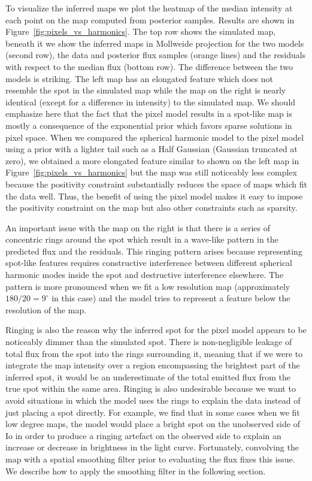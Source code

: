 \documentclass[linenumbers,modern]{aastex62}
\begin{document}
To visualize the inferred maps we plot the heatmap of the median intensity at each point on the map computed from posterior samples.
Results are shown in Figure~\ref{fig:pixels_vs_harmonics}.
The top row shows the simulated map, beneath it we show the inferred maps in Mollweide projection for the two models (second row), the data and posterior flux samples (orange lines) and the residuals with respect to the median flux (bottom row).
The difference between the two models is striking. 
The left map has an elongated feature which does not resemble the spot in the simulated map while the map on the right is nearly identical (except for a difference in intensity) to the simulated map. 
We should emphasize here that the fact that the pixel model results in a spot-like map is mostly a consequence of the exponential prior which favors sparse solutions in pixel space.
When we compared the spherical harmonic model to the pixel model using a prior with a lighter tail such as a Half Gaussian (Gaussian truncated at zero), we obtained a more elongated feature similar to shown on the left map in Figure~\ref{fig:pixels_vs_harmonics} but the map was still noticeably less complex because the positivity constraint substantially reduces the space of maps which fit the data well. 
Thus, the benefit of using the pixel model makes it easy to impose the positivity constraint on the map but also other constraints such as sparsity.

An important issue with the map on the right is that there is a series of concentric rings around the spot which result in a wave-like pattern in the predicted flux and the residuals.
This ringing pattern arises because representing spot-like features requires constructive interference between different spherical harmonic modes inside the spot and destructive interference elsewhere.
The pattern is more pronounced when we fit a low resolution map (approximately $180/20=9^\circ$ in this case) and the model tries to represent a feature below the resolution of the map.

Ringing is also the reason why the inferred spot for the pixel model appears to be noticeably dimmer than the simulated spot.
There is non-negligible leakage of total flux from the spot into the rings surrounding it, meaning that if we were to integrate the map intensity over a region encompassing the brightest part of the inferred spot, it would be an underestimate of the total emitted flux from the true spot within the same area.
Ringing is also undesirable because we want to avoid situations in which the model uses the rings to explain the data instead of just placing a spot directly. 
For example, we find that in some cases when we fit low degree maps, the model would place a bright spot on the unobserved side of Io in order to produce a ringing artefact on the observed side to explain an increase or decrease in brightness in the light curve. 
Fortunately, convolving the map with a spatial smoothing filter prior to evaluating the flux fixes this issue. 
We describe how to apply the smoothing filter in the following section.
\end{document}

